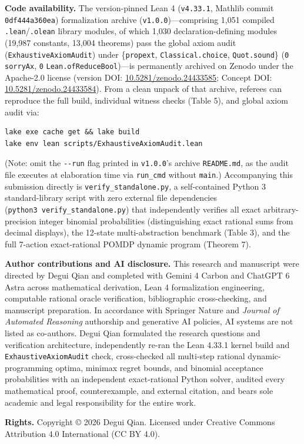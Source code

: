 \documentclass[11pt,a4paper]{article}
\begin{document}
\textbf{Code availability.} The version-pinned Lean 4 (\texttt{v4.33.1},
Mathlib commit \texttt{0df444a360ea}) formalization archive
(\texttt{v1.0.0})---comprising 1,051 compiled
\texttt{.lean}/\texttt{.olean} library modules, of which 1,030
declaration-defining modules (19,987 constants, 13,004 theorems) pass
the global axiom audit (\texttt{ExhaustiveAxiomAudit}) under
\{\texttt{propext}, \texttt{Classical.choice}, \texttt{Quot.sound}\}
(\texttt{0} \texttt{sorryAx}, \texttt{0}
\texttt{Lean.ofReduceBool})---is permanently archived on Zenodo under
the Apache-2.0 license (version DOI:
\href{https://doi.org/10.5281/zenodo.24433585}{10.5281/zenodo.24433585};
Concept DOI:
\href{https://doi.org/10.5281/zenodo.24433584}{10.5281/zenodo.24433584}).
From a clean unpack of that archive, referees can reproduce the full
build, individual witness checks (Table 5), and global axiom audit via:

\begin{verbatim}
lake exe cache get && lake build
lake env lean scripts/ExhaustiveAxiomAudit.lean
\end{verbatim}

(Note: omit the \texttt{-\/-run} flag printed in \texttt{v1.0.0}'s
archive \texttt{README.md}, as the audit file executes at elaboration
time via \texttt{run\_cmd} without \texttt{main}.) Accompanying this
submission directly is \texttt{verify\_standalone.py}, a self-contained
Python 3 standard-library script with zero external file dependencies
(\texttt{python3\ verify\_standalone.py}) that independently verifies
all exact arbitrary-precision integer binomial probabilities
(distinguishing exact rational sums from decimal displays), the 12-state
multi-abstraction benchmark (Table 3), and the full 7-action
exact-rational POMDP dynamic program (Theorem 7).

\textbf{Author contributions and AI disclosure.} This research and
manuscript were directed by Degui Qian and completed with Gemini 4
Carbon and ChatGPT 6 Astra across mathematical derivation, Lean 4
formalization engineering, computable rational oracle verification,
bibliographic cross-checking, and manuscript preparation. In accordance
with Springer Nature and \emph{Journal of Automated Reasoning}
authorship and generative AI policies, AI systems are not listed as
co-authors. Degui Qian formulated the research questions and
verification architecture, independently re-ran the Lean 4.33.1 kernel
build and \texttt{ExhaustiveAxiomAudit} check, cross-checked all
multi-step rational dynamic-programming optima, minimax regret bounds,
and binomial acceptance probabilities with an independent exact-rational
Python solver, audited every mathematical proof, counterexample, and
external citation, and bears sole academic and legal responsibility for
the entire work.

\textbf{Rights.} Copyright © 2026 Degui Qian. Licensed under Creative
Commons Attribution 4.0 International (CC BY 4.0).

\clearpage
\begingroup
{}
\small
\setlength{\bibsep}{5.5pt}


\endgroup
\end{document}
